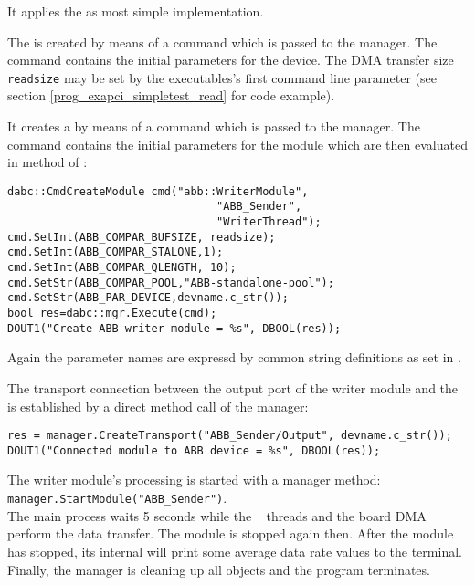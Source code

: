 \begin{compactenum} 

\item It applies the  as most simple
 implementation.

\item The  is created by means of a command
 which is passed to the manager. The 
command contains the initial parameters for the device.
The DMA transfer size {\tt readsize} may be set by
the executables's first command line parameter
(see section \ref{prog_exapci_simpletest_read} for code example).

\item It creates a  by means of a command
 which is passed to the manager. The 
command contains the initial
parameters for the module which are then evaluated in 
method  of :
\begin{small}
\begin{verbatim} 
dabc::CmdCreateModule cmd("abb::WriterModule",
                                "ABB_Sender", 
                                "WriterThread");
cmd.SetInt(ABB_COMPAR_BUFSIZE, readsize);
cmd.SetInt(ABB_COMPAR_STALONE,1);
cmd.SetInt(ABB_COMPAR_QLENGTH, 10);
cmd.SetStr(ABB_COMPAR_POOL,"ABB-standalone-pool");
cmd.SetStr(ABB_PAR_DEVICE,devname.c_str());
bool res=dabc::mgr.Execute(cmd);
DOUT1("Create ABB writer module = %s", DBOOL(res));
\end{verbatim} 
\end{small}
Again the parameter names are expressd by 
common string definitions as set in . 

\item The transport connection between the output port of the writer module and
the  is established by a direct method call of the manager:
\begin{small}
\begin{verbatim}
res = manager.CreateTransport("ABB_Sender/Output", devname.c_str());
DOUT1("Connected module to ABB device = %s", DBOOL(res));
\end{verbatim}  
\end{small}

\item The writer module's processing 
is started with a manager method: \\
{\tt manager.StartModule("ABB\_Sender")}. \\
The main process waits 5 seconds while the \dabc~ threads
and the board DMA perform the data transfer. The module is stopped
again then. After the module has stopped, its internal 
will print some average data rate values to the terminal.
Finally, the manager is cleaning up all objects
and the program terminates.


\end{compactenum} 

